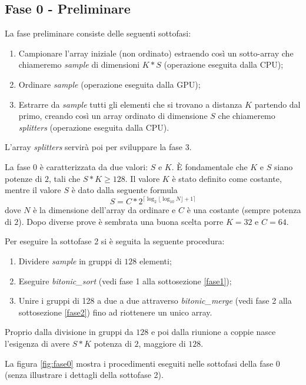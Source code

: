 \documentclass[a4paper, 11pt]{article}
\begin{document}
		\subsection{Fase 0 - Preliminare}
			\label{fase0}
			La fase preliminare consiste delle seguenti sottofasi:
			\begin{enumerate}
				\item Campionare l'array iniziale (non ordinato) estraendo così un sotto-array che chiameremo \emph{sample} di dimensioni $K*S$ 
				(operazione eseguita dalla CPU);
				\item Ordinare \emph{sample} (operazione eseguita dalla GPU);
				\item Estrarre da \emph{sample} tutti gli elementi che si trovano a distanza $K$ partendo dal primo, creando così
					un array ordinato di dimensione $S$ che chiameremo \emph{splitters} (operazione eseguita dalla CPU).
			\end{enumerate} 
			L'array \emph{splitters} servirà poi per sviluppare la fase 3.
			
			La fase 0 è caratterizzata da due valori: $S$ e $K$.
			È fondamentale che $K$ e $S$ siano potenze di $2$, tali che $S*K \geq 128$.
			Il valore $K$ è stato definito come costante, 
			mentre il valore $S$ è dato dalla seguente formula			
			$$S = C * 2^{\lceil \log_2 \lfloor \log_{10} N \rfloor + 1 \rceil}$$
			dove $N$ è la dimensione dell'array da ordinare e 
			$C$ è una costante (sempre potenza di $2$). 
			Dopo diverse prove è sembrata una buona scelta porre $K = 32$ e $C = 64$.
			
			Per eseguire la sottofase 2 si è seguita la seguente procedura:
			\begin{enumerate}
				\item Dividere \emph{sample} in gruppi di $128$ elementi;
				\item Eseguire \emph{bitonic\_sort} \cite{BS} (vedi fase 1 alla sottosezione \ref{fase1});
				\item Unire i gruppi di 128 a due a due attraverso \emph{bitonic\_merge} \cite{BS} (vedi fase 2 alla sottosezione \ref{fase2}) 
				fino ad riottenere un unico array.
			\end{enumerate}
		
			Proprio dalla divisione in gruppi da $128$ e poi dalla riunione a coppie nasce l'esigenza di avere $S*K$ potenza 
			di $2$, maggiore di $128$.
			
			La figura \ref{fig:fase0} mostra i procedimenti eseguiti nelle sottofasi della fase 0
			(senza illustrare i dettagli della sottofase 2).
			
\end{document}
